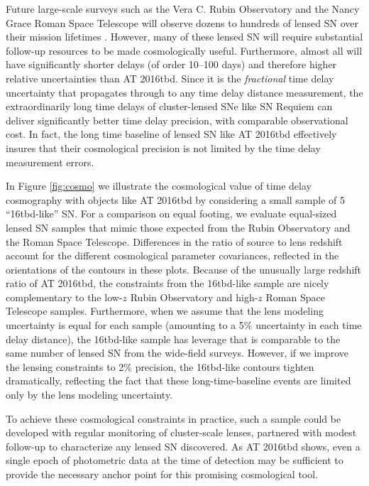 \documentclass[12pt]{article}
\def\SNABC{AT 2016tbd\xspace}
\def\reqlike{16tbd-like\xspace}
\begin{document}
Future large-scale surveys such as the Vera C. Rubin Observatory 
and the Nancy Grace Roman Space Telescope will observe dozens to hundreds of lensed SN over their mission lifetimes \cite{oguri_gravitationally_2010,goldstein_rates_2019,wojtak_magnified_2019}. However, many of these lensed SN will require substantial follow-up resources to be made cosmologically useful. Furthermore, almost all will have significantly shorter 
delays (of order 10--100 days) and therefore higher relative uncertainties than \SNABC.  Since it is the {\it fractional} time delay uncertainty that 
propagates through to any time delay distance measurement, the extraordinarily long time delays of cluster-lensed SNe like SN Requiem can deliver significantly better time delay precision, with comparable observational cost.  In fact, the long time baseline of lensed SN like \SNABC effectively insures that their cosmological precision is not limited by the time delay measurement errors.  

In Figure \ref{fig:cosmo} we illustrate the cosmological value of time delay cosmography with objects like \SNABC  by considering a small sample of 5 ``\reqlike'' SN.  For a comparison on equal footing, we evaluate equal-sized lensed SN samples 
that mimic those expected from the Rubin Observatory and  the Roman Space Telescope.  Differences in the 
ratio of source to lens redshift account for the different cosmological parameter covariances, reflected in the orientations of the contours in these plots. Because of the unusually large redshift ratio of \SNABC, the constraints 
from the \reqlike sample are nicely complementary to the low-$z$ Rubin Observatory and high-$z$ Roman Space Telescope samples. 
Furthermore, when we assume that the lens modeling uncertainty is equal for each sample (amounting to a 5\% uncertainty in each time delay distance), the \reqlike sample has leverage that is comparable to the same number of lensed SN from the wide-field surveys. However, if we improve  the lensing constraints to 2\% precision, the \reqlike contours tighten dramatically, reflecting the fact that these long-time-baseline events are limited only by the lens modeling uncertainty.

To achieve these cosmological constraints in practice, such a sample could be developed with regular monitoring of cluster-scale lenses, partnered with modest follow-up to characterize any lensed SN discovered.  As \SNABC shows, even a single epoch of photometric data at the time of detection may be sufficient to provide the necessary anchor point for this promising cosmological tool.  %
\end{document}
